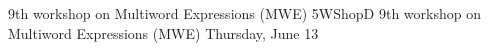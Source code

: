 \begin{wsschedule}
{9th workshop on Multiword Expressions (MWE)}
{5}{WShopD}
{9th workshop on Multiword Expressions (MWE)}
{Thursday, June 13}{\WShopLocD}

\end{wsschedule}
